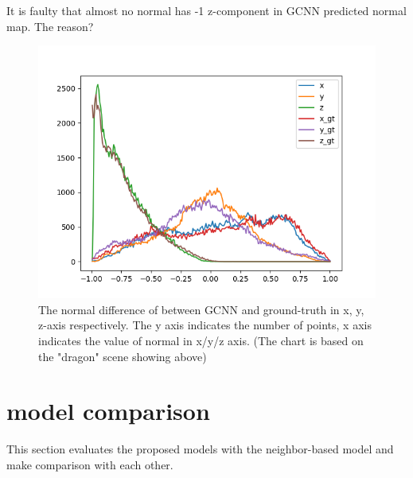 It is faulty that almost no normal has -1 z-component in GCNN predicted normal map. The reason?
\begin{figure}[h!]
	\centering
	\includegraphics[width=\linewidth]{./Figures/normal-histo-diff.png}
	\caption{The normal difference of between GCNN and ground-truth in x, y, z-axis respectively. The y axis indicates the number of points, x axis indicates the value of normal in x/y/z axis. (The chart is based on the "dragon" scene showing above)}
	\label{fig:normal-histo-diff}
\end{figure}


\newpage 
\section{model comparison}
This section evaluates the proposed models with the neighbor-based model and make comparison with each other.

